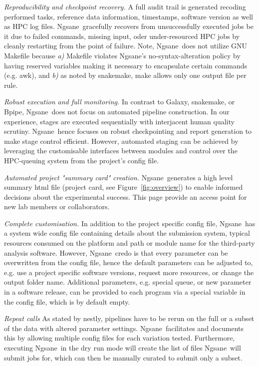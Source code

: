 \documentclass{bioinfo}
\newcommand{\prog}{{\sc Ngsane}}
\begin{document}
{\it Reproducibility and checkpoint recovery.}
A full audit trail is generated recoding performed tasks, reference data information, timestamps, software version as well as HPC log files. 
\prog\ gracefully recovers from unsuccessfully executed jobs be it due to failed commands, missing input, oder under-resourced HPC jobs by cleanly
restarting from the point of failure. 
Note, \prog\ does not utilize {\sc GNU Makefile} because {\it a)} {\sc Makefile} violates \prog 's no-syntax-alteration policy by having reserved variables making it necessary to encapsulate certain commands (e.g. {\sc awk}), and {\it b)} as noted by {\sc snakemake}, make allows only one output file per rule.   

{\it Robust execution and full monitoring.}
In contrast to {\sc Galaxy}, {\sc snakemake}, or {\sc Bpipe}, \prog\ does not focus on automated pipeline construction. 
In our experience, stages are executed sequentially with interjacent human quality scrutiny. 
\prog\ hence focuses on robust checkpointing and report generation to make stage control efficient. 
However, automated staging can be achieved by leveraging the customisable interfaces between modules and control over the HPC-queuing system from the project's config file.

{\it Automated project "summary card" creation.}
\prog\ generates a high level summary html file (project card, see Figure~\ref{fig:overview}) to enable informed decisions about the experimental success. 
This page provide an access point for new lab members or collaborators.

{\it Complete customisation.}
In addition to the project specific config file, \prog\ has a system wide config file containing details about the submission system, typical resources consumed on the platform and path or module name for the third-party analysis software.
However, \prog\ credo is that every parameter can be overwritten from the config file, hence the default parameters can be adjusted to, e.g. use a project specific software versions, request more resources, or change the output folder name. 
Additional parameters, e.g. special queue, or new parameter in a software release, can be provided to each program via a special variable in the config file, which is by default empty.  

{\it Repeat calls}
As stated by {\sc nestly}, pipelines have to be rerun on the full or a subset of the data with altered parameter settings. 
\prog\ facilitates and documents this by allowing multiple config files for each variation tested. 
Furthermore, executing \prog\ in the dry run mode will create the list of files \prog\ will submit jobs for, which can then be manually curated to submit only a subset.
\end{document}
